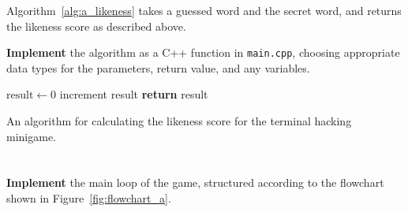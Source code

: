 \documentclass{../../../fal_assignment}
\begin{document}
Algorithm~\ref{alg:a_likeness} takes a guessed word and the secret word, and returns the likeness score as described above.

\textbf{Implement} the algorithm as a C++ function in \texttt{main.cpp}, choosing appropriate data types for the parameters, return value, and any variables.

\begin{algorithm}[t]
	\begin{algorithmic}
		\State $\text{result} \gets 0$
		\State increment result
		\EndIf
		\EndFor
		\State \textbf{return} result
		\EndProcedure
	\end{algorithmic}
	\caption{An algorithm for calculating the likeness score for the terminal hacking minigame.}
	\label{alg:a_likeness}
\end{algorithm}

\section{} \label{core-a-last}

\textbf{Implement} the main loop of the game, structured
according to the flowchart shown in Figure~\ref{fig:flowchart_a}.
\end{document}
